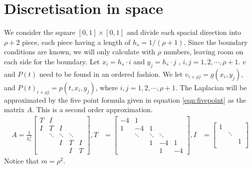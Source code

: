 \section{Discretisation in space} \label{sec:space}
We consider the square $[0,1] \times [0,1]$ and divide each spacial direction into $\rho+2$ piece, each piece having a length of $h_s = 1/(\rho+1)$. Since the boundary conditions are known, we will only calculate with $\rho$ numbers, leaving room on each side for the boundary. Let $x_i = h_s \cdot i$ and $y_j = h_s \cdot j$ , $i,j =1,2,\cdots, \rho + 1 $.  $v$ and $P(t)$ need to be found in an ordered fashion. We let  $v_{i+\rho j} = g(x_i, y_j)$, and 
$P(t)_{i+\rho j} = p(t,x_i, y_j)$, where $i,j = 1,2,\cdots, \rho+1$.
The Laplacian will be approximated by the five point formula given in equation \eqref{eqn:fivepoint} as the matrix $A$. This is a second order approximation.
\begin{equation} \label{eqn:fivepoint} 
\begin{aligned} 
A = \frac{1}{h_s^2} 
\begin{bmatrix}
T & I & & &\\
I& T & I & &\\
& \ddots & \ddots & \ddots & \\
& & I& T & I\\
& & & I & T
\end{bmatrix}
, T  &= 
\begin{bmatrix}
-4 & 1 & & &\\
1 & -4 & 1 & &  \\
& \ddots & \ddots & \ddots & \\
&  & 1 & -4 & 1 \\
 & & & 1 & -4
\end{bmatrix},
I &= 
\begin{bmatrix}
1 & &\\
& \ddots & \\
& & 1 \\
\end{bmatrix}
\end{aligned}
\end{equation}
Notice that $m = \rho ^2$.

